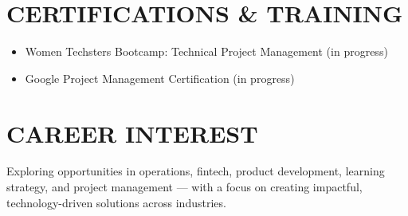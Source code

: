 \documentclass[a4paper,12pt]{article}
\begin{document}

\section{CERTIFICATIONS \& TRAINING}

\begin{itemize}[leftmargin=1em,itemsep=3pt,label=--]
    \item Women Techsters Bootcamp: Technical Project Management (in progress)
    \item Google Project Management Certification (in progress)
\end{itemize}


\section{CAREER INTEREST}

Exploring opportunities in operations, fintech, product development, learning strategy, and project management — with a focus on creating impactful, technology-driven solutions across industries.

\vfill
{}
\end{document}
